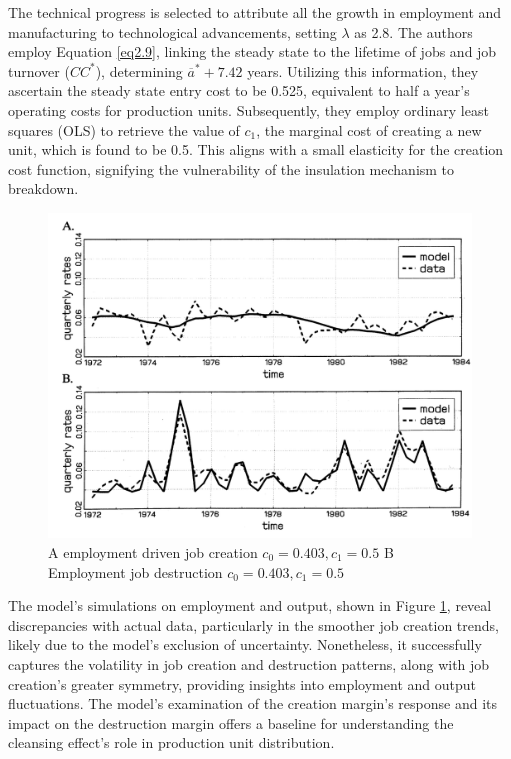\documentclass[12pt]{report}
\begin{document}
The technical progress is selected to attribute all the growth in employment and manufacturing to technological
advancements, setting \(\lambda\) as 2.8. The authors employ Equation \ref{eq2.9}, linking the steady state to the
lifetime of jobs and job turnover (\(CC^*\)), determining \(\overline{a}^*+7.42\) years. Utilizing this information,
they ascertain the steady state entry cost to be 0.525, equivalent to half a year's operating costs for production
units. Subsequently, they employ ordinary least squares (OLS) to retrieve the value of \(c_1\), the marginal cost of
creating a new unit, which is found to be 0.5. This aligns with a small elasticity for the creation cost function,
signifying the vulnerability of the insulation mechanism to breakdown. 
\begin{figure}
    \centering
    \includegraphics[scale = 0.6]{figure/Plot2.5.png}
    \caption{A employment driven job creation \(c_0=0.403, c_1=0.5\) B Employment job destruction \(c_0=0.403, c_1=0.5\)} 
    \label{plot:2.5}
\end{figure}
The model's simulations on employment and output, shown in Figure \ref{plot:2.5}, reveal discrepancies with actual data,
particularly in the smoother job creation trends, likely due to the model's exclusion of uncertainty. Nonetheless, it
successfully captures the volatility in job creation and destruction patterns, along with job creation's greater
symmetry, providing insights into employment and output fluctuations. The model's examination of the creation margin's
response and its impact on the destruction margin offers a baseline for understanding the cleansing effect's role in
production unit distribution.
\end{document}
